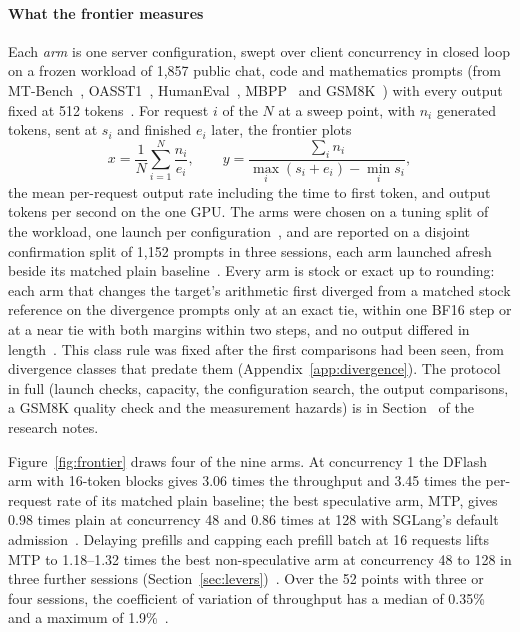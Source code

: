 \paragraph{What the frontier measures}\label{sec:serving-frontiers} Each \emph{arm} is one server configuration, swept over client concurrency in closed loop on a frozen workload of 1,857 public chat, code and mathematics prompts (from MT-Bench~\cite{mtbench}, OASST1~\cite{oasst1}, HumanEval~\cite{humaneval}, MBPP~\cite{mbpp} and GSM8K~\cite{gsm8k}) with every output fixed at 512 tokens~. For request $i$ of the $N$ at a sweep point, with $n_i$ generated tokens, sent at $s_i$ and finished $e_i$ later, the frontier plots
\begin{equation}
x=\frac1N\sum_{i=1}^N\frac{n_i}{e_i},\qquad y=\frac{\sum_in_i}{\max_i(s_i+e_i)-\min_is_i},\label{eq:frontier}
\end{equation}
the mean per-request output rate including the time to first token, and output tokens per second on the one GPU. The arms were chosen on a tuning split of the workload, one launch per configuration~, and are reported on a disjoint confirmation split of 1,152 prompts in three sessions, each arm launched afresh beside its matched plain baseline~. Every arm is stock or exact up to rounding: each arm that changes the target's arithmetic first diverged from a matched stock reference on the divergence prompts only at an exact tie, within one BF16 step or at a near tie with both margins within two steps, and no output differed in length~. This class rule was fixed after the first comparisons had been seen, from divergence classes that predate them (Appendix~\ref{app:divergence}). The protocol in full (launch checks, capacity, the configuration search, the output comparisons, a GSM8K quality check and the measurement hazards) is in Section~ of the research notes.

Figure~\ref{fig:frontier} draws four of the nine arms. At concurrency 1 the DFlash arm with 16-token blocks gives 3.06 times the throughput and 3.45 times the per-request rate of its matched plain baseline; the best speculative arm, MTP, gives 0.98 times plain at concurrency 48 and 0.86 times at 128 with SGLang's default admission~. Delaying prefills and capping each prefill batch at 16 requests lifts MTP to 1.18--1.32 times the best non-speculative arm at concurrency 48 to 128 in three further sessions (Section~\ref{sec:levers})~. Over the 52 points with three or four sessions, the coefficient of variation of throughput has a median of 0.35\% and a maximum of 1.9\%~.


